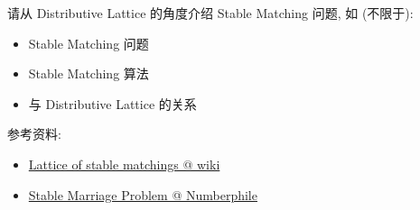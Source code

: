 \documentclass[a4paper, justified]{tufte-handout}
\begin{document}
\vspace{0.50cm}
\begin{ot}
  请从 Distributive Lattice 的角度介绍 Stable Matching 问题, 如 (不限于):
  \begin{itemize}
    \item Stable Matching 问题
    \item Stable Matching 算法
    \item 与 Distributive Lattice 的关系
  \end{itemize}

  \noindent 参考资料:
  \begin{itemize}
    \item \href{https://en.wikipedia.org/wiki/Lattice\_of\_stable\_matchings}{Lattice of stable matchings @ wiki}
    \item \href{https://www.youtube.com/watch?v=Qcv1IqHWAzg}{Stable Marriage Problem @ Numberphile}
  \end{itemize}
\end{ot}



\begincorrection


\beginfb

\end{document}
